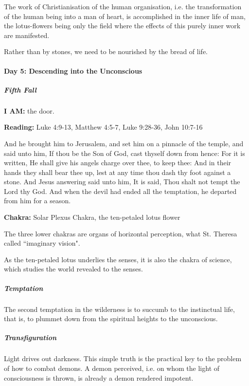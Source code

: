 The work of Christianisation of the human organisation, i.e. the transformation of the human being into a man of heart, is accomplished in the inner life of man, the lotus-flowers being only the field where the effects of this purely inner work are manifested.

Rather than by stones, we need to be nourished by the bread of life.

\paragraph{Day 5: Descending into the Unconscious}

\subparagraph{Fifth Fall}

\textbf{I AM:} the door.

\textbf{Reading:} Luke 4:9-13, Matthew 4:5-7, Luke 9:28-36, John 10:7-16

\begin{quotex}
And he brought him to Jerusalem, and set him on a pinnacle of the temple, and said unto him, If thou be the Son of God, cast thyself down from hence: For it is written, He shall give his angels charge over thee, to keep thee: And in their hands they shall bear thee up, lest at any time thou dash thy foot against a stone. And Jesus answering said unto him, It is said, Thou shalt not tempt the Lord thy God. And when the devil had ended all the temptation, he departed from him for a season. 

\end{quotex}

\textbf{Chakra:} Solar Plexus Chakra, the ten-petaled lotus flower


The three lower chakras are organs of horizontal perception, what St. Theresa called ``imaginary vision".

As the ten-petaled lotus underlies the senses, it is also the chakra of science, which studies the world revealed to the senses.


\subparagraph{Temptation}

The second temptation in the wilderness is to succumb to the instinctual life, that is, to plummet down from the spiritual heights to the unconscious.


\subparagraph{Transfiguration}

Light drives out darkness. This simple truth is the practical key to the problem of how to combat demons. A demon perceived, i.e. on whom the light of consciousness is thrown, is already a demon rendered impotent.


